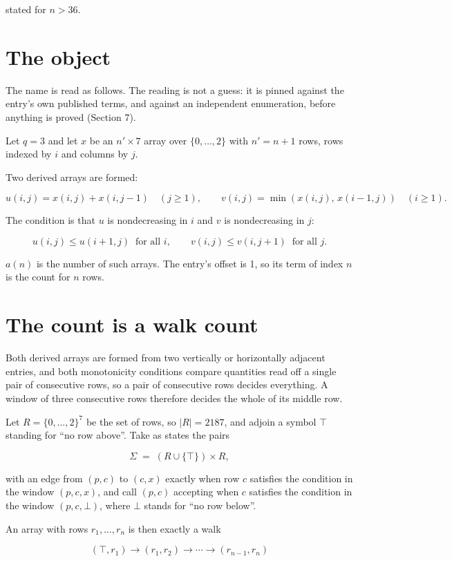 \documentclass[11pt]{article}
\theoremstyle{definition}
\begin{document}
stated for $n > 36$.

\section{The object}

The name is read as follows. The reading is not a guess: it is pinned against the entry's own published terms, and against an independent enumeration, before anything is proved (Section 7).

Let $q = 3$ and let $x$ be an $n' \times 7$ array over $\{0,\dots,2\}$ with $n' = n + 1$ rows, rows indexed by $i$ and columns by $j$.

Two derived arrays are formed:

\[u(i,j) = x(i,j) + x(i,j{-}1)\quad (j \ge 1), \qquad v(i,j) = \min(x(i,j),\,x(i{-}1,j))\quad (i \ge 1).\]

The condition is that $u$ is nondecreasing in $i$ and $v$ is nondecreasing in $j$:

\[u(i,j) \le u(i{+}1,j) \ \text{ for all } i, \qquad v(i,j) \le v(i,j{+}1) \ \text{ for all } j.\]

$a(n)$ is the number of such arrays. The entry's offset is 1, so its term of index $n$ is the count for $n$ rows.

\section{The count is a walk count}

Both derived arrays are formed from two vertically or horizontally adjacent entries, and both monotonicity conditions compare quantities read off a single pair of consecutive rows, so a pair of consecutive rows decides everything. A window of three consecutive rows therefore decides the whole of its middle row.

Let $R = \{0,\dots,2\}^{7}$ be the set of rows, so $|R| = 2187$, and adjoin a symbol $\top$ standing for ``no row above''. Take as states the pairs

\[\Sigma \;=\; (R \cup \{\top\}) \times R,\]

with an edge from $(p,c)$ to $(c,x)$ exactly when row $c$ satisfies the condition in the window $(p,c,x)$, and call $(p,c)$ accepting when $c$ satisfies the condition in the window $(p,c,\bot)$, where $\bot$ stands for ``no row below''.

An array with rows $r_1,\dots,r_n$ is then exactly a walk

\[(\top,r_1) \to (r_1,r_2) \to \cdots \to (r_{n-1},r_n)\]
\end{document}
